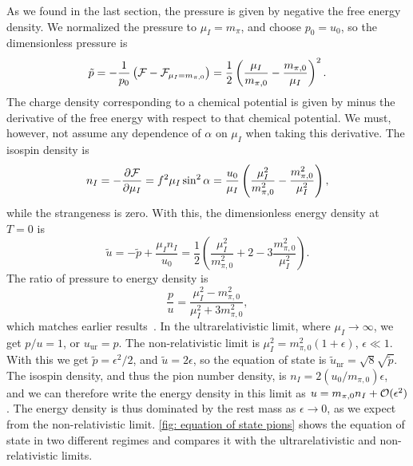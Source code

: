 As we found in the last section, the pressure is given by negative the free energy density. 
We normalized the pressure to $\mu_I = m_{\pi}$, and choose $p_0 = u_0$, so the dimensionless pressure is
%
\begin{equation}
    \label{pressure leading order chpt}
    \tilde p = -\frac{1}{p_0} \left(\mathcal{F} - \mathcal{F}_{\mu_I=m_{\pi,0}}\right) 
    = \frac{1}{2} \left(\frac{\mu_I}{m_{\pi,0}} - \frac{m_{\pi,0}}{\mu_I}\right)^2.
\end{equation}
%
The charge density corresponding to a chemical potential is given by minus the derivative of the free energy with respect to that chemical potential. 
We must, however, not assume any dependence of $\alpha$ on $\mu_I$ when taking this derivative.
The isospin density is
%
\begin{equation}
    \label{isospin density}
    n_I = -\pdv{\mathcal{F}}{\mu_I} = f^2 \mu_I \sin^2 \alpha 
    = 
    \frac{u_0}{\mu_I} \left(\frac{\mu_I^2}{m_{\pi,0}^2} - \frac{m_{\pi,0}^2}{\mu_I^2}\right),
\end{equation}
%
while the strangeness is zero.
With this, the dimensionless energy density at $T = 0$ is
%
\begin{equation}
    \label{energy density leading order chpt}
    \tilde u = - \tilde p + \frac{\mu_I n_I}{u_0}
    = \frac{1}{2} \left(\frac{\mu_I^2}{m_{\pi,0}^2} + 2 - 3\frac{m_{\pi,0}^2}{\mu_I^2}\right).
\end{equation}
%
The ratio of pressure to energy density is
%
\begin{equation} 
    \label{pressure energy ratio leading order chpt}
    \frac{p}{u} = \frac{\mu_I^2 - m_{\pi,0}^2}{\mu_I^2+3{m_{\pi,0}^2}},
\end{equation}
%
which matches earlier results~\autocite{sonQCDFiniteIsospin2001}.
In the ultrarelativistic limit, where $\mu_I \rightarrow \infty$, we get $p / u = 1$, or $u_\text{ur} = p$.
The non-relativistic limit is $\mu_I^2 = m_{\pi,0}^2(1 + \epsilon)$, $\epsilon \ll 1$.
With this we get $\tilde p = \epsilon^2 / 2 $, and $\tilde u = 2\epsilon$, so the equation of state is $\tilde u_\text{nr} = \sqrt 8 \sqrt{\tilde p}$.
The isospin density, and thus the pion number density, is $n_I = 2 ({u_0}/{m_{\pi,0}}) \epsilon$, and we can therefore write the energy density in this limit as $u = m_{\pi,0} n_I + \mathcal O(\epsilon^2)$.
The energy density is thus dominated by the rest mass as $\epsilon \rightarrow 0$, as we expect from the non-relativistic limit.
\autoref{fig: equation of state pions} shows the equation of state in two different regimes and compares it with the ultrarelativistic and non-relativistic limits.

